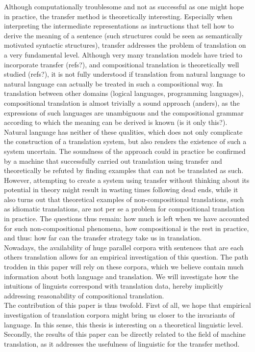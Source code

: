 \documentclass[a4paper, 11pt]{report}
\theoremstyle{definition}
\theoremstyle{plain}
\begin{document}
Although computationally troublesome and not as successful as one might hope in practice, the transfer method is theoretically interesting. Especially when interpreting the intermediate representations as instructions that tell how to derive the meaning of a sentence (such structures could be seen as semantically motivated syntactic structures), transfer addresses the problem of translation on a very fundamental level. Although very many translation models have tried to incorporate transfer (refs?), and compositional translation is theoretically well studied (refs?), it is not fully understood if translation from natural language to natural language can actually be treated in such a compositional way. In translation between other domains (logical languages, programming languages), compositional translation is almost trivially a sound approach (anders), as the expressions of such languages are unambiguous and the compositional grammar according to which the meaning can be derived is known (is it only this?). Natural language has neither of these qualities, which does not only complicate the construction of a translation system, but also renders the existence of such a system uncertain. The soundness of the approach could in practice be confirmed by a machine that successfully carried out translation using transfer and theoretically be refuted by finding examples that can not be translated as such. However, attempting to create a system using transfer without thinking about its potential in theory might result in wasting times following dead ends, while it also turns out that theoretical examples of non-compositional translations, such as idiomatic translations, are not per se a problem for compositional translation in practice. The questions thus remain: how much is left when we have accounted for such non-compositional phenomena, how compositional is the rest in practice, and thus: how far can the transfer strategy take us in translation.\\
Nowadays, the availability of huge parallel corpora with sentences that are each others translation allows for an empirical investigation of this question. The path trodden in this paper will rely on these corpora, which we believe contain much information about both language and translation. We will investigate how the intuitions of linguists correspond with translation data, hereby implicitly addressing reasonability of compositional translation.\\
The contribution of this paper is thus twofold. First of all, we hope that empirical investigation of translation corpora might bring us closer to the invariants of language. In this sense, this thesis is interesting on a theoretical linguistic level. Secondly, the results of this paper can be directly related to the field of machine translation, as it addresses the usefulness of linguistic for the transfer method.
\end{document}
